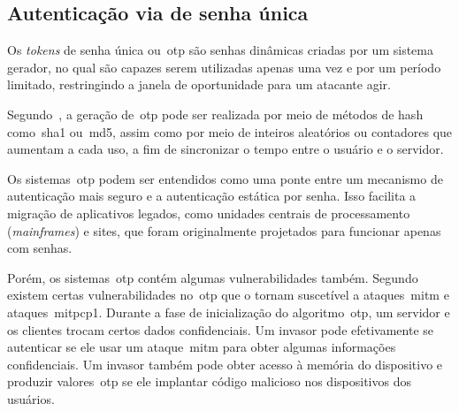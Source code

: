 \subsection{Autenticação via  de senha única}
\label{subsec:autenticacao-token-senha-unica}

Os \textit{tokens} de senha única ou~\acrfull{otp} são senhas dinâmicas criadas
por um sistema gerador, no qual são capazes serem utilizadas apenas uma vez e
por um período limitado, restringindo a janela de oportunidade para
um atacante agir\cite{christiana2019}.

Segundo~\textcite{huiyi2013}, a geração de~\acrshort{otp} pode ser realizada
por meio de métodos de hash como~\acrfull{sha1} ou~\acrfull{md5}, assim como por
meio de inteiros aleatórios ou contadores que aumentam a cada uso, a fim de
sincronizar o tempo entre o usuário e o servidor.

Os sistemas~\acrshort{otp} podem ser entendidos como uma ponte entre um
mecanismo de autenticação mais seguro e a autenticação estática por senha.
Isso facilita a migração de aplicativos legados, como unidades centrais de
processamento (\textit{mainframes}) e sites, que foram originalmente projetados
para funcionar apenas com senhas\cite{idrus2013}.

Porém, os sistemas~\acrshort{otp} contém algumas vulnerabilidades também.
Segundo~\textcite{hoyul2015} existem certas vulnerabilidades no~\acrshort{otp
} que o tornam
suscetível a ataques~\acrfull{mitm} e ataques~\acrfull{mitpcp1}.
Durante a fase de inicialização do algoritmo~\acrshort{otp}, um servidor e os
clientes trocam certos dados confidenciais.
Um invasor pode efetivamente se autenticar se ele usar um ataque~\acrshort{mitm}
para obter algumas informações confidenciais.
Um invasor também pode obter acesso à memória do dispositivo e
produzir valores~\acrshort{otp} se ele implantar código malicioso nos
dispositivos dos usuários\cite{hoyul2015}.